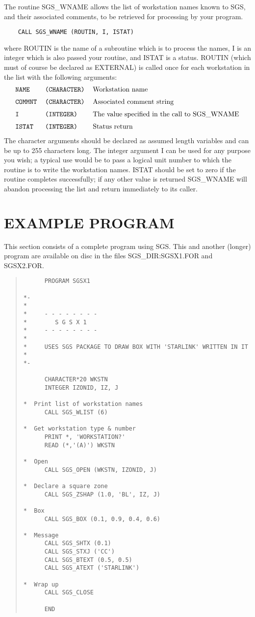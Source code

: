 The routine SGS\_WNAME allows the list of workstation names known to SGS,
and their associated comments, to be retrieved for processing by your
program.
\begin{verbatim}
    CALL SGS_WNAME (ROUTIN, I, ISTAT)
\end{verbatim}
where ROUTIN is the name of a subroutine which is to process the names, I
is an integer which is also passed your routine, 
and ISTAT is a status.  ROUTIN (which must of course be 
declared as EXTERNAL) is called once for
each workstation in the list with the following arguments:
\[\begin{tabular}{lll}
\tt NAME&\tt (CHARACTER)&Workstation name\\[\medskipamount]
\tt COMMNT&\tt (CHARACTER)&Associated comment string\\[\medskipamount]
\tt I&\tt (INTEGER)&The value specified in the call to 
SGS\_WNAME\\[\medskipamount]
\tt ISTAT&\tt (INTEGER)&Status return
\end{tabular}\]
The character arguments should be declared as assumed length variables and
can be up to 255 characters long.  The integer argument I can be used for
any purpose you wish; a typical use would be to pass a logical unit number
to which the routine is to write the workstation names.  ISTAT should be
set to zero if the routine completes successfully; if any other value is
returned SGS\_WNAME will abandon processing the list and return immediately
to its caller. 

\section {EXAMPLE PROGRAM}\label{sec-example}

This section consists of a complete program using SGS.  This
and another (longer) program are available on disc in the
files SGS\_DIR:SGSX1.FOR and SGSX2.FOR.
\begin{quote}
\begin{verbatim}
      PROGRAM SGSX1

*-
*
*     - - - - - - - -
*        S G S X 1
*     - - - - - - - -
*
*     USES SGS PACKAGE TO DRAW BOX WITH 'STARLINK' WRITTEN IN IT
*
*-

      CHARACTER*20 WKSTN
      INTEGER IZONID, IZ, J 

*  Print list of workstation names
      CALL SGS_WLIST (6)

*  Get workstation type & number
      PRINT *, 'WORKSTATION?'
      READ (*,'(A)') WKSTN

*  Open
      CALL SGS_OPEN (WKSTN, IZONID, J)

*  Declare a square zone
      CALL SGS_ZSHAP (1.0, 'BL', IZ, J)

*  Box
      CALL SGS_BOX (0.1, 0.9, 0.4, 0.6)

*  Message
      CALL SGS_SHTX (0.1)
      CALL SGS_STXJ ('CC')
      CALL SGS_BTEXT (0.5, 0.5)
      CALL SGS_ATEXT ('STARLINK')

*  Wrap up
      CALL SGS_CLOSE

      END
\end{verbatim}
\end{quote}          

